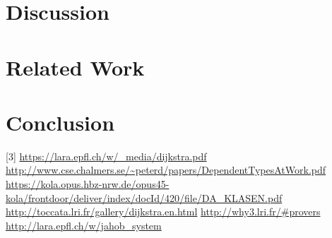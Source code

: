 \documentclass[11pt, a4paper]{article} %
\theoremstyle{definition}
\begin{document}

\section{Discussion}




\section{Related Work}




\section{Conclusion}

\newpage %

%

[3] \url{https://lara.epfl.ch/w/_media/dijkstra.pdf} 
\newline
[2] \url{http://www.cse.chalmers.se/~peterd/papers/DependentTypesAtWork.pdf}
\newline
[1] \url{https://kola.opus.hbz-nrw.de/opus45-kola/frontdoor/deliver/index/docId/420/file/DA_KLASEN.pdf}
\newline
[4] \url{http://toccata.lri.fr/gallery/dijkstra.en.html}
\newline
[5]\url{http://why3.lri.fr/#provers}
\newline
[6] \url{http://lara.epfl.ch/w/jahob_system}
\end{document}
